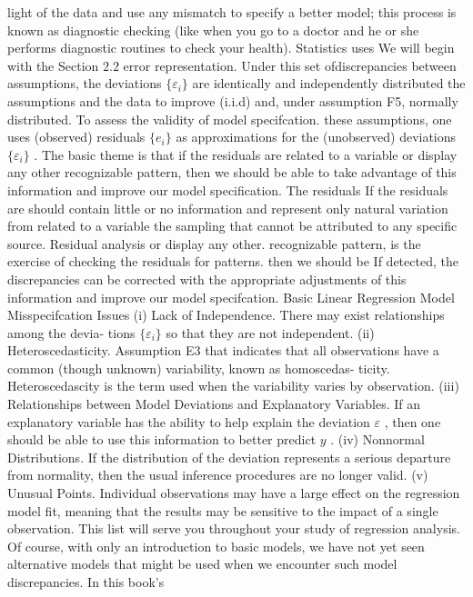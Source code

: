 \documentclass[11pt]{article}
\begin{document}
light of the data and use any mismatch to specify a better model; this process
is known as diagnostic checking (like when you go to a doctor and he or she
 performs diagnostic routines to check your health). Statistics uses
We will begin with the Section \(2 . 2\) error representation. Under this set ofdiscrepancies between
assumptions, the deviations \(\{\varepsilon_{i} \}\) are identically and independently distributed the assumptions and
the data to improve
(i.i.d) and, under assumption F5, normally distributed. To assess the validity of model specifcation.
these assumptions, one uses (observed) residuals \(\{e_{i} \}\) as approximations for the
(unobserved) deviations \(\{\varepsilon_{i} \}\) . The basic theme is that if the residuals are related to
 a variable or display any other recognizable pattern, then we should be able to take
 advantage of this information and improve our model specification. The residuals If the residuals are
 should contain little or no information and represent only natural variation from related to a variable
 the sampling that cannot be attributed to any specific source. Residual analysis or display any other.
 recognizable pattern,
is the exercise of checking the residuals for patterns. then we should be
If detected, the discrepancies can be corrected with the appropriate adjustments of this information
 and improve our
 model specifcation.
 Basic Linear Regression
 Model Misspecifcation Issues
(i) Lack of Independence. There may exist relationships among the devia-
tions \(\{\varepsilon_{i} \}\) so that they are not independent.
(ii) Heteroscedasticity. Assumption E3 that indicates that all observations
have a common (though unknown) variability, known as homoscedas-
ticity. Heteroscedascity is the term used when the variability varies by
observation.
(iii) Relationships between Model Deviations and Explanatory Variables.
 If an explanatory variable has the ability to help explain the deviation \(\varepsilon\) ,
 then one should be able to use this information to better predict \(y\) .
(iv) Nonnormal Distributions. If the distribution of the deviation represents
 a serious departure from normality, then the usual inference procedures
 are no longer valid.
(v) Unusual Points. Individual observations may have a large effect on the
regression model fit, meaning that the results may be sensitive to the
 impact of a single observation.
This list will serve you throughout your study of regression analysis. Of course,
 with only an introduction to basic models, we have not yet seen alternative models
that might be used when we encounter such model discrepancies. In this book's
\end{document}
